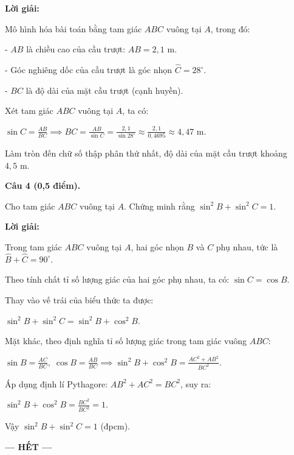 \documentclass[12pt,a4paper]{article}
\begin{document}
\noindent\textbf{Lời giải:}

Mô hình hóa bài toán bằng tam giác $ABC$ vuông tại $A$, trong đó:\par - $AB$ là chiều cao của cầu trượt: $AB = 2{,}1\text{ m}$.\par - Góc nghiêng dốc của cầu trượt là góc nhọn $\widehat{C} = 28^\circ$.\par - $BC$ là độ dài của mặt cầu trượt (cạnh huyền).\par Xét tam giác $ABC$ vuông tại $A$, ta có:\par $\sin C = \frac{AB}{BC} \implies BC = \frac{AB}{\sin C} = \frac{2{,}1}{\sin 28^\circ} \approx \frac{2{,}1}{0{,}4695} \approx 4{,}47\text{ m}$.\par Làm tròn đến chữ số thập phân thứ nhất, độ dài của mặt cầu trượt khoảng $4{,}5\text{ m}$.

\vspace{3mm}
\noindent\textbf{Câu 4 (0,5 điểm).}

Cho tam giác $ABC$ vuông tại $A$. Chứng minh rằng $\sin^2 B + \sin^2 C = 1$.

\noindent\textbf{Lời giải:}

Trong tam giác $ABC$ vuông tại $A$, hai góc nhọn $B$ và $C$ phụ nhau, tức là $\widehat{B} + \widehat{C} = 90^\circ$.\par Theo tính chất tỉ số lượng giác của hai góc phụ nhau, ta có: $\sin C = \cos B$.\par Thay vào vế trái của biểu thức ta được:\par $\sin^2 B + \sin^2 C = \sin^2 B + \cos^2 B$.\par Mặt khác, theo định nghĩa tỉ số lượng giác trong tam giác vuông $ABC$:\par $\sin B = \frac{AC}{BC},\; \cos B = \frac{AB}{BC} \implies \sin^2 B + \cos^2 B = \frac{AC^2 + AB^2}{BC^2}$.\par Áp dụng định lí Pythagore: $AB^2 + AC^2 = BC^2$, suy ra:\par $\sin^2 B + \cos^2 B = \frac{BC^2}{BC^2} = 1$.\par Vậy $\sin^2 B + \sin^2 C = 1$ (đpcm).

\vspace{3mm}

\vfill
\begin{center}
  \textbf{--- HẾT ---}
\end{center}
\end{document}

